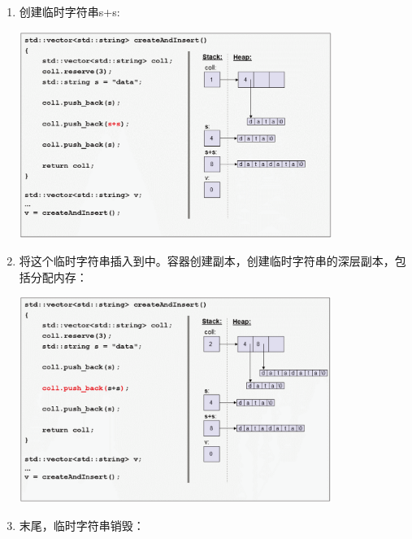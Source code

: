 \begin{itemize}
	\begin{enumerate}
		\item 创建临时字符串s+s:

		\begin{center}
			\includegraphics[width=0.8\textwidth]{part1/ch1/images/3}
		\end{center}
		\item 将这个临时字符串插入到中。容器创建副本，创建临时字符串的深层副本，包括分配内存：

		\begin{center}
			\includegraphics[width=0.8\textwidth]{part1/ch1/images/4}
		\end{center}
		\item 末尾，临时字符串销毁：


\end{enumerate}
\end{itemize}
